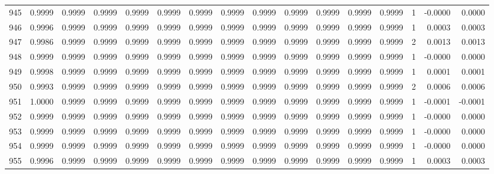 \begin{tabular}{lrrrrrrrrrrrrrrr}
945 &      0.9999 &  0.9999 &  0.9999 &  0.9999 &  0.9999 &  0.9999 &  0.9999 &  0.9999 &  0.9999 &  0.9999 &   0.9999 &     0.9999 &      1 &                   -0.0000 &                     0.0000 \\
946 &      0.9996 &  0.9999 &  0.9999 &  0.9999 &  0.9999 &  0.9999 &  0.9999 &  0.9999 &  0.9999 &  0.9999 &   0.9999 &     0.9999 &      1 &                    0.0003 &                     0.0003 \\
947 &      0.9986 &  0.9999 &  0.9999 &  0.9999 &  0.9999 &  0.9999 &  0.9999 &  0.9999 &  0.9999 &  0.9999 &   0.9999 &     0.9999 &      2 &                    0.0013 &                     0.0013 \\
948 &      0.9999 &  0.9999 &  0.9999 &  0.9999 &  0.9999 &  0.9999 &  0.9999 &  0.9999 &  0.9999 &  0.9999 &   0.9999 &     0.9999 &      1 &                   -0.0000 &                     0.0000 \\
949 &      0.9998 &  0.9999 &  0.9999 &  0.9999 &  0.9999 &  0.9999 &  0.9999 &  0.9999 &  0.9999 &  0.9999 &   0.9999 &     0.9999 &      1 &                    0.0001 &                     0.0001 \\
950 &      0.9993 &  0.9999 &  0.9999 &  0.9999 &  0.9999 &  0.9999 &  0.9999 &  0.9999 &  0.9999 &  0.9999 &   0.9999 &     0.9999 &      2 &                    0.0006 &                     0.0006 \\
951 &      1.0000 &  0.9999 &  0.9999 &  0.9999 &  0.9999 &  0.9999 &  0.9999 &  0.9999 &  0.9999 &  0.9999 &   0.9999 &     0.9999 &      1 &                   -0.0001 &                    -0.0001 \\
952 &      0.9999 &  0.9999 &  0.9999 &  0.9999 &  0.9999 &  0.9999 &  0.9999 &  0.9999 &  0.9999 &  0.9999 &   0.9999 &     0.9999 &      1 &                   -0.0000 &                     0.0000 \\
953 &      0.9999 &  0.9999 &  0.9999 &  0.9999 &  0.9999 &  0.9999 &  0.9999 &  0.9999 &  0.9999 &  0.9999 &   0.9999 &     0.9999 &      1 &                   -0.0000 &                     0.0000 \\
954 &      0.9999 &  0.9999 &  0.9999 &  0.9999 &  0.9999 &  0.9999 &  0.9999 &  0.9999 &  0.9999 &  0.9999 &   0.9999 &     0.9999 &      1 &                   -0.0000 &                     0.0000 \\
955 &      0.9996 &  0.9999 &  0.9999 &  0.9999 &  0.9999 &  0.9999 &  0.9999 &  0.9999 &  0.9999 &  0.9999 &   0.9999 &     0.9999 &      1 &                    0.0003 &                     0.0003 \\

\end{tabular}
